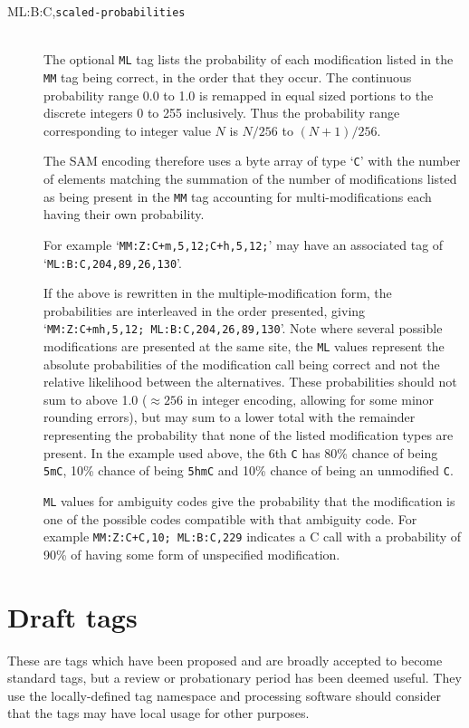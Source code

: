\documentclass[10pt]{article}
\newcommand{\tagvalue}[1]{{\tt #1}}
\begin{document}
\begin{description}
\item[ML:B:C,\tagvalue{scaled-probabilities}]
\hfill\\
The optional {\tt ML} tag lists the probability of each modification listed in the {\tt MM} tag being correct, in the order that they occur.
The continuous probability range 0.0 to 1.0 is remapped in equal
sized portions to the discrete integers 0 to 255 inclusively. Thus the
probability range corresponding to integer value $N$ is $N/256$ to
$(N+1)/256$.

The SAM encoding therefore uses a byte array of type `{\tt C}' with the number of elements matching the summation of the number of modifications listed as being present in the {\tt MM} tag accounting for multi-modifications each having their own probability.

For example `{\tt MM:Z:C+m,5,12;C+h,5,12;}' may have an associated tag of `{\tt ML:B:C,204,89,26,130}'.

If the above is rewritten in the multiple-modification form, the probabilities are interleaved in the order presented, giving `{\tt MM:Z:C+mh,5,12;  ML:B:C,204,26,89,130}'.
Note where several possible modifications are presented at the same site, the {\tt ML} values represent the absolute probabilities of the modification call being correct and not the relative likelihood between the alternatives.
These probabilities should not sum to above 1.0 ($\approx 256$ in integer encoding, allowing for some minor rounding errors), but may sum to a lower total with the remainder representing the probability that none of the listed modification types are present.
In the example used above, the 6th {\tt C} has 80\% chance of being {\tt 5mC}, 10\% chance of being {\tt 5hmC} and 10\% chance of being an unmodified {\tt C}.

{\tt ML} values for ambiguity codes give the probability that the modification is one of the possible codes compatible with that ambiguity code.
For example {\tt MM:Z:C+C,10; ML:B:C,229} indicates a C call with a probability of 90\% of having some form of unspecified modification.

\end{description}

\section{Draft tags}

These are tags which have been proposed and are broadly accepted to
become standard tags, but a review or probationary period has been
deemed useful.  They use the locally-defined tag namespace and
processing software should consider that the tags may have local usage
for other purposes.
\end{document}
